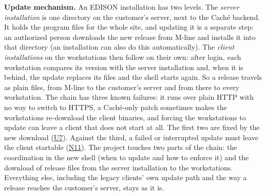\documentclass{article}
\newcommand{\req}[1]{\hyperlink{req:#1}{#1}}
\begin{document}
\noindent \textbf{Update mechanism.} An EDISON installation has two levels. The \emph{server installation} is one directory on the customer's server, next to the Caché backend. It holds the program files for the whole site, and updating it is a separate step: an authorized person downloads the new release from M-line and installs it into that directory (an installation can also do this automatically). The \emph{client installations} on the workstations then follow on their own: after login, each workstation compares its version with the server installation and, when it is behind, the update replaces its files and the shell starts again. So a release travels as plain files, from M-line to the customer's server and from there to every workstation. The chain has three known failures: it runs over plain HTTP with no way to switch to HTTPS, a Caché-only patch sometimes makes the workstations re-download the client binaries, and forcing the workstations to update can leave a client that does not start at all. The first two are fixed by the new download (\req{U7}). Against the third, a failed or interrupted update must leave the client startable (\req{N11}). The project touches two parts of the chain: the coordination in the new shell (when to update and how to enforce it) and the download of release files from the server installation to the workstations. Everything else, including the legacy clients' own update path and the way a release reaches the customer's server, stays as it is.
\end{document}

